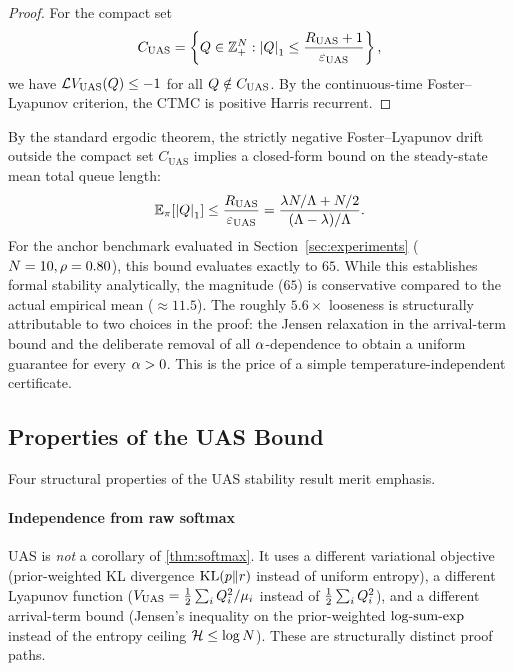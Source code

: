 \begin{proof}
For the compact set
\begin{equation}
\label{eq:uas_compact}
C_{\mathrm{UAS}} = \left\{Q \in \mathbb{Z}_+^N : \left\lvert Q \right\rvert_1 \leq \frac{R_{\mathrm{UAS}} + 1}{\varepsilon_{\mathrm{UAS}}}\right\},
\end{equation}
we have $\mathcal{L} V_{\mathrm{UAS}}(Q) \leq -1$ for all $Q \notin C_{\mathrm{UAS}}$. By the continuous-time Foster--Lyapunov criterion, the CTMC is positive Harris recurrent.
\end{proof}

\begin{corollary}
\label{cor:uas_expectation}
By the standard ergodic theorem, the strictly negative Foster--Lyapunov drift outside the compact set $C_{\mathrm{UAS}}$ implies a closed-form bound on the steady-state mean total queue length:
\begin{equation}
\label{eq:uas_expectation}
\mathbb{E}_{\pi}[\left\lvert Q \right\rvert_1] \leq \frac{R_{\mathrm{UAS}}}{\varepsilon_{\mathrm{UAS}}} = \frac{\lambda N / \Lambda + N / 2}{(\Lambda - \lambda)/\Lambda}.
\end{equation}
For the anchor benchmark evaluated in Section~\ref{sec:experiments} ($N=10, \rho=0.80$), this bound evaluates exactly to $65$. While this establishes formal stability analytically, the magnitude ($65$) is conservative compared to the actual empirical mean ($\approx 11.5$). The roughly $5.6\times$ looseness is structurally attributable to two choices in the proof: the Jensen relaxation in the arrival-term bound and the deliberate removal of all $\alpha$-dependence to obtain a uniform guarantee for every $\alpha > 0$. This is the price of a simple temperature-independent certificate.
\end{corollary}

\subsection{Properties of the UAS Bound}
\label{sec:uas:discussion}

Four structural properties of the UAS stability result merit emphasis.

\paragraph{Independence from raw softmax}
\label{sec:uas:discussion:independence}
UAS is \emph{not} a corollary of \cref{thm:softmax}. It uses a different variational objective (prior-weighted KL divergence $\mathrm{KL}(p\|r)$ instead of uniform entropy), a different Lyapunov function ($V_{\mathrm{UAS}} = \frac{1}{2}\sum_i Q_{i}^2/\mu_i$ instead of $\frac{1}{2}\sum_i Q_{i}^2$), and a different arrival-term bound (Jensen's inequality on the prior-weighted $\mathrm{log\text{-}sum\text{-}exp}$ instead of the entropy ceiling $\mathcal{H} \leq \log N$). These are structurally distinct proof paths.


